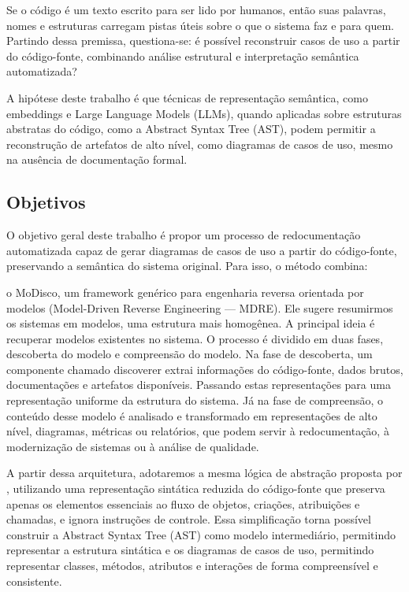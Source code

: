 \documentclass[12pt,a4paper]{article}
\begin{document}
Se o código é um texto escrito para ser lido por humanos, então suas palavras, nomes e estruturas carregam pistas úteis sobre o que o sistema faz e para quem. Partindo dessa premissa, questiona-se: é possível reconstruir casos de uso a partir do código-fonte, combinando análise estrutural e interpretação semântica automatizada?

A hipótese deste trabalho é que técnicas de representação semântica, como embeddings e Large Language Models (LLMs), quando aplicadas sobre estruturas abstratas do código, como a Abstract Syntax Tree (AST), podem permitir a reconstrução de artefatos de alto nível, como diagramas de casos de uso, mesmo na ausência de documentação formal.

\subsection{Objetivos}

O objetivo geral deste trabalho é propor um processo de redocumentação automatizada capaz de gerar diagramas de casos de uso a partir do código-fonte, preservando a semântica do sistema original.
Para isso, o método combina:

\textcite{Bruneliere2010MoDisco} o MoDisco, um framework genérico para engenharia reversa orientada por modelos (Model-Driven Reverse Engineering — MDRE). Ele sugere resumirmos os sistemas em modelos, uma estrutura mais homogênea. A principal ideia é recuperar modelos existentes no sistema. O processo é dividido em duas fases, descoberta do modelo e compreensão do modelo. Na fase de descoberta, um componente chamado discoverer extrai informações do código-fonte, dados brutos, documentações e artefatos disponíveis. Passando estas representações para uma representação uniforme da estrutura do sistema. Já na fase de compreensão, o conteúdo desse modelo é analisado e transformado em representações de alto nível, diagramas, métricas ou relatórios, que podem servir à redocumentação, à modernização de sistemas ou à análise de qualidade.

A partir dessa arquitetura, adotaremos a mesma lógica de abstração proposta por \textcite{tonella2007reverse}, utilizando uma representação sintática reduzida do código-fonte que preserva apenas os elementos essenciais ao fluxo de objetos, criações, atribuições e chamadas, e ignora instruções de controle. Essa simplificação torna possível construir a Abstract Syntax Tree (AST) como modelo intermediário, permitindo representar a estrutura sintática e os diagramas de casos de uso, permitindo representar classes, métodos, atributos e interações de forma compreensível e consistente.
\end{document}
